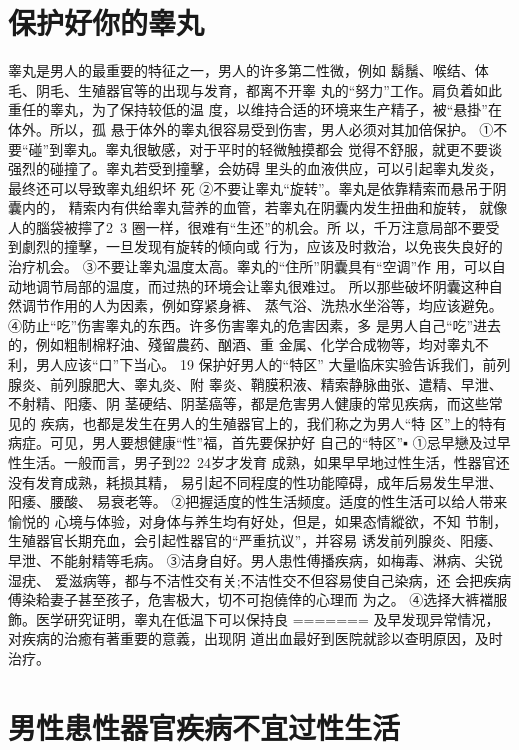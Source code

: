 \documentclass[12pt,UTF8]{ctexbook}
\begin{document}
\section{保护好你的睾丸}
睾丸是男人的最重要的特征之一，男人的许多第二性微，例如
鬍鬚、喉结、体毛、阴毛、生殖器官等的出现与发育，都离不开睾
丸的“努力”工作。肩负着如此重任的睾丸，为了保持较低的温
度，以维持合适的环境来生产精子，被“悬掛”在体外。所以，孤
悬于体外的睾丸很容易受到伤害，男人必须对其加倍保护。
①不要“碰”到睾丸。睾丸很敏感，对于平时的轻微触摸都会
觉得不舒服，就更不要谈强烈的碰撞了。睾丸若受到撞擊，会妨碍
里头的血液供应，可以引起睾丸发炎，最终还可以导致睾丸组织坏
死
②不要让睾丸“旋转”。睾丸是依靠精索而悬吊于阴囊内的，
精索内有供给睾丸营养的血管，若睾丸在阴囊内发生扭曲和旋转，
就像人的腦袋被擰了2~3 圈一样，很难有“生还”的机会。所
以，千万注意局部不要受到劇烈的撞擊，一旦发现有旋转的倾向或
行为，应该及时救治，以免丧失良好的治疗机会。
③不要让睾丸温度太高。睾丸的“住所”阴囊具有“空调”作
用，可以自动地调节局部的温度，而过热的环境会让睾丸很难过。
所以那些破坏阴囊这种自然调节作用的人为因素，例如穿紧身裤、
蒸气浴、洗热水坐浴等，均应该避免。
④防止“吃”伤害睾丸的东西。许多伤害睾丸的危害因素，多
是男人自己“吃”进去的，例如粗制棉籽油、殘留農药、酗酒、重
金属、化学合成物等，均对睾丸不利，男人应该“口”下当心。
19 保护好男人的“特区”
大量临床实验告诉我们，前列腺炎、前列腺肥大、睾丸炎、附
睾炎、鞘膜积液、精索静脉曲张、遣精、早泄、不射精、阳痿、阴
茎硬结、阴茎癌等，都是危害男人健康的常见疾病，而这些常见的
疾病，也都是发生在男人的生殖器官上的，我们称之为男人“特
区”上的特有病症。可见，男人要想健康“性”福，首先要保护好
自己的“特区”▪
①忌早戀及过早性生活。一般而言，男子到22~24岁才发育
成熟，如果早早地过性生活，性器官还没有发育成熟，耗损其精，
易引起不同程度的性功能障碍，成年后易发生早泄、阳痿、腰酸、
易衰老等。
②把握适度的性生活频度。适度的性生活可以给人带来愉悦的
心境与体验，对身体与养生均有好处，但是，如果态情縱欲，不知
节制，生殖器官长期充血，会引起性器官的“严重抗议”，并容易
诱发前列腺炎、阳痿、早泄、不能射精等毛病。
③洁身自好。男人患性傅播疾病，如梅毒、淋病、尖锐湿疣、
爱滋病等，都与不洁性交有关;不洁性交不但容易使自己染病，还
会把疾病傅染耠妻子甚至孩子，危害极大，切不可抱僥倖的心理而
为之。
④选择大裤襠服飾。医学研究证明，睾丸在低温下可以保持良
=======
及早发现异常情况，对疾病的治癒有著重要的意義，出现阴
道出血最好到医院就診以查明原因，及时治疗。

\section{男性患性器官疾病不宜过性生活}
\end{document}
